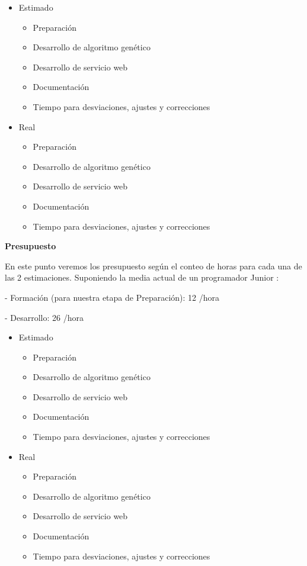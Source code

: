 \begin{itemize}
	
	\item Estimado
		\begin{itemize}
			\item Preparación
			\item Desarrollo de algoritmo genético
			\item Desarrollo de servicio web
			\item Documentación
			\item Tiempo para desviaciones, ajustes y correcciones
		\end{itemize}
	
	\item Real
		\begin{itemize}
			\item Preparación
			\item Desarrollo de algoritmo genético
			\item Desarrollo de servicio web
			\item Documentación
			\item Tiempo para desviaciones, ajustes y correcciones
		\end{itemize}
		
\end{itemize}

\textbf{Presupuesto}

En este punto veremos los presupuesto según el conteo de horas para cada una de las 2 estimaciones. Suponiendo la media actual de un programador Junior \cite{sueldos}:

\bigskip
- Formación (para nuestra etapa de Preparación): 12 \officialeuro/hora

- Desarrollo: 26 \officialeuro/hora

\bigskip
\begin{itemize}
	
	\item Estimado
	\begin{itemize}
		\item Preparación
		\item Desarrollo de algoritmo genético
		\item Desarrollo de servicio web
		\item Documentación
		\item Tiempo para desviaciones, ajustes y correcciones
	\end{itemize}
	
	\item Real
	\begin{itemize}
		\item Preparación
		\item Desarrollo de algoritmo genético
		\item Desarrollo de servicio web
		\item Documentación
		\item Tiempo para desviaciones, ajustes y correcciones
	\end{itemize}

\end{itemize}



